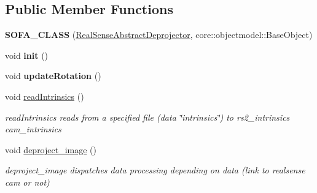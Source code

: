 \subsection*{Public Member Functions}
\begin{DoxyCompactItemize}
\item 
\mbox{\label{classsofa_1_1rgbdtracking_1_1_real_sense_abstract_deprojector_a595c10a0bf6eb93a562e9cb12dd269b7}} 
{\bfseries S\+O\+F\+A\+\_\+\+C\+L\+A\+SS} (\hyperlink{classsofa_1_1rgbdtracking_1_1_real_sense_abstract_deprojector}{Real\+Sense\+Abstract\+Deprojector}, core\+::objectmodel\+::\+Base\+Object)
\item 
\mbox{\label{classsofa_1_1rgbdtracking_1_1_real_sense_abstract_deprojector_ac809ca0096bb6ec5f003194ecef42533}} 
void {\bfseries init} ()
\item 
\mbox{\label{classsofa_1_1rgbdtracking_1_1_real_sense_abstract_deprojector_aa5d3f7544bcd6800709aab00e9d67792}} 
void {\bfseries update\+Rotation} ()
\item 
\mbox{\label{classsofa_1_1rgbdtracking_1_1_real_sense_abstract_deprojector_a9b933303db901af2174388a524b671a1}} 
void \hyperlink{classsofa_1_1rgbdtracking_1_1_real_sense_abstract_deprojector_a9b933303db901af2174388a524b671a1}{read\+Intrinsics} ()
\begin{DoxyCompactList}\small\item\em read\+Intrinsics reads from a specified file (data \char`\"{}intrinsics\char`\"{}) to rs2\+\_\+intrinsics cam\+\_\+intrinsics \end{DoxyCompactList}\item 
\mbox{\label{classsofa_1_1rgbdtracking_1_1_real_sense_abstract_deprojector_a7b8c549b1df30b374c1431594bcac52b}} 
void \hyperlink{classsofa_1_1rgbdtracking_1_1_real_sense_abstract_deprojector_a7b8c549b1df30b374c1431594bcac52b}{deproject\+\_\+image} ()
\begin{DoxyCompactList}\small\item\em deproject\+\_\+image dispatches data processing depending on data (link to realsense cam or not) \end{DoxyCompactList}\item 

\end{DoxyCompactItemize}
